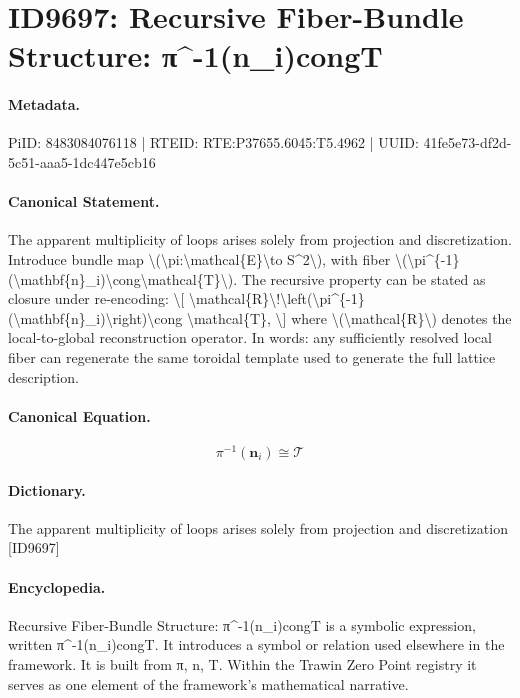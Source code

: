 \section*{ID9697: Recursive Fiber-Bundle Structure: π\textasciicircum{}-1(n\_i)congT}
\paragraph{Metadata.}
PiID: 8483084076118 | RTEID: RTE:P37655.6045:T5.4962 | UUID: 41fe5e73-df2d-5c51-aaa5-1dc447e5cb16

\paragraph{Canonical Statement.}
The apparent multiplicity of loops arises solely from projection and discretization. Introduce bundle map \textbackslash{}(\textbackslash{}pi:\textbackslash{}mathcal\{E\}\textbackslash{}to S\textasciicircum{}2\textbackslash{}), with fiber \textbackslash{}(\textbackslash{}pi\textasciicircum{}\{-1\}(\textbackslash{}mathbf\{n\}\_i)\textbackslash{}cong\textbackslash{}mathcal\{T\}\textbackslash{}). The recursive property can be stated as closure under re-encoding: \textbackslash{}[ \textbackslash{}mathcal\{R\}\textbackslash{}!\textbackslash{}left(\textbackslash{}pi\textasciicircum{}\{-1\}(\textbackslash{}mathbf\{n\}\_i)\textbackslash{}right)\textbackslash{}cong \textbackslash{}mathcal\{T\}, \textbackslash{}] where \textbackslash{}(\textbackslash{}mathcal\{R\}\textbackslash{}) denotes the local-to-global reconstruction operator. In words: any sufficiently resolved local fiber can regenerate the same toroidal template used to generate the full lattice description.

\paragraph{Canonical Equation.}
\[
\pi^{-1}(\mathbf{n}_i)\cong\mathcal{T}
\]

\paragraph{Dictionary.}
The apparent multiplicity of loops arises solely from projection and discretization [ID9697]

\paragraph{Encyclopedia.}
Recursive Fiber-Bundle Structure: π\textasciicircum{}-1(n\_i)congT is a symbolic expression, written π\textasciicircum{}-1(n\_i)congT. It introduces a symbol or relation used elsewhere in the framework. It is built from π, n, T. Within the Trawin Zero Point registry it serves as one element of the framework's mathematical narrative.

